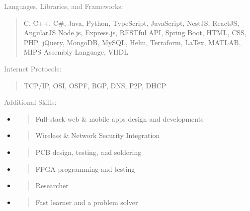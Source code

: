 \documentclass[letterpage]{article}
\begin{document}
\begin{minipage}[t]{0.424\linewidth}
  \vspace{7px}
  \textcolor{gray}{Languages, Libraries, and Frameworks:} \\ 
  \begin{quote}
    \textmd{C, C++, C\#, Java, Python, TypeScript, JavaScript, NestJS, ReactJS, AngularJS Node.js, Express.js, RESTful API, Spring Boot,  HTML, CSS, PHP, jQuery,
    MongoDB, MySQL, Helm, Terraform,  LaTex, MATLAB, MIPS Assembly
    Language, VHDL}\\
  \end{quote}

  \vspace{7px}
  \textcolor{gray}{Internet Protocols:}  \\
  \begin{quote}
      \textmd{TCP/IP, OSI, OSPF, BGP, DNS, P2P, DHCP}\\
  \end{quote}

  \vspace{7px}
  \textcolor{gray}{Additional Skills:}  \\
  \begin{itemize}[leftmargin=*,labelindent=0mm,labelsep=0mm]
    \raggedright
  \item
    \begin{quote}
        \textmd{Full-stack web \& mobile apps design and developments}
    \end{quote}
  \item
    \begin{quote}      
        \textmd{Wireless \&  Network Security Integration}
    \end{quote}
  \item
    \begin{quote}
        \textmd{PCB design, testing, and soldering}
    \end{quote}
  \item
    \begin{quote}
        \textmd{FPGA programming and testing}
    \end{quote}
  \item
    \begin{quote}
        \textsf{Researcher}
    \end{quote}
  \item
    \begin{quote}
        \textmd{Fast learner and a problem solver}
    \end{quote}
  \end{itemize}
\end{minipage}
\end{document}
